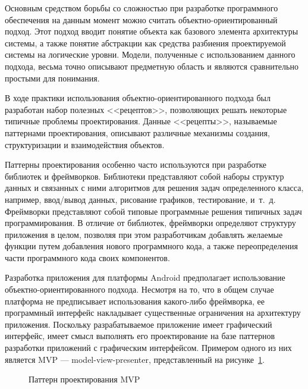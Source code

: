Основным средством борьбы со сложностью при разработке программного обеспечения
на данным момент можно считать объектно-ориентированный подход.
Этот подход вводит понятие объекта как базового элемента
архитектуры системы, а также понятие абстракции как средства
разбиения проектируемой системы на логические уровни.
Модели, полученные с использованием данного подхода, весьма точно
описывают предметную область и являются сравнительно простыми для понимания.

В ходе практики использования объектно-ориентированного подхода
был разработан набор полезных <<рецептов>>,
позволяющих решать некоторые типичные проблемы проектирования.
Данные <<рецепты>>, называемые паттернами проектирования,
описывают различные механизмы создания, структуризации и взаимодействия объектов.

Паттерны проектирования особенно часто используются при разработке
библиотек и фреймворков.
Библиотеки представляют собой наборы структур данных и
связанных с ними алгоритмов для решения задач определенного класса,
например, ввод/вывод данных, рисование графиков, тестирование, и~т.~д.
Фреймворки представляют собой типовые программные решения
типичных задач программирования.
В отличие от библиотек, фреймворки определяют структуру приложения в целом,
позволяя при этом разработчикам добавлять желаемые функции путем
добавления нового программного кода, а также переопределения
части программного кода своих компонентов.

Разработка приложения для платформы Android предполагает использование
объектно-ориентированного подхода. Несмотря на то, что в общем случае
платформа не предписывает использования какого-либо фреймворка,
ее программный интерфейс накладывает существенные ограничения на
архитектуру приложения.
Поскольку разрабатываемое приложение имеет графический интерфейс,
имеет смысл выполнять его проектирование на базе паттернов
разработки приложений с графическим интерфейсом.
Примером одного из них является MVP --- model-view-presenter,
представленный на рисунке~\ref{fig:design_mvp}.

\begin{figure}[h!]
  \centering
  \caption{Паттерн проектирования MVP}
  \label{fig:design_mvp}
\end{figure}

